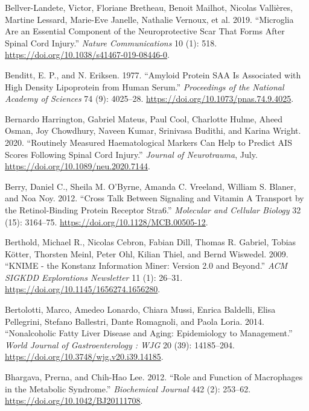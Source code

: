 \documentclass[9pt,lineno]{elife}
\newlength{\cslhangindent}
\newlength{\cslentryspacingunit} %
\newenvironment{CSLReferences}[2] %
 {%
  \setlength{\parindent}{0pt}
  \ifodd #1
  \let\oldpar\par
  \def\par{\hangindent=\cslhangindent\oldpar}
  \fi
  \setlength{\parskip}{#2\cslentryspacingunit}
 }%
 {}
\begin{document}
\begin{landscape}
\begin{landscape}
\begin{landscape}
\begin{landscape}
\begin{CSLReferences}{1}{0}
\leavevmode{}%
Bellver-Landete, Victor, Floriane Bretheau, Benoit Mailhot, Nicolas Vallières, Martine Lessard, Marie-Eve Janelle, Nathalie Vernoux, et al. 2019. {``Microglia Are an Essential Component of the Neuroprotective Scar That Forms After Spinal Cord Injury.''} \emph{Nature Communications} 10 (1): 518. \url{https://doi.org/10.1038/s41467-019-08446-0}.

\leavevmode{}%
Benditt, E. P., and N. Eriksen. 1977. {``Amyloid Protein {SAA} Is Associated with High Density Lipoprotein from Human Serum.''} \emph{Proceedings of the National Academy of Sciences} 74 (9): 4025--28. \url{https://doi.org/10.1073/pnas.74.9.4025}.

\leavevmode{}%
Bernardo Harrington, Gabriel Mateus, Paul Cool, Charlotte Hulme, Aheed Osman, Joy Chowdhury, Naveen Kumar, Srinivasa Budithi, and Karina Wright. 2020. {``Routinely Measured Haematological Markers Can Help to Predict {AIS} Scores Following Spinal Cord Injury.''} \emph{Journal of Neurotrauma}, July. \url{https://doi.org/10.1089/neu.2020.7144}.

\leavevmode{}%
Berry, Daniel C., Sheila M. O'Byrne, Amanda C. Vreeland, William S. Blaner, and Noa Noy. 2012. {``Cross {Talk} Between {Signaling} and {Vitamin A Transport} by the {Retinol-Binding Protein Receptor Stra6}.''} \emph{Molecular and Cellular Biology} 32 (15): 3164--75. \url{https://doi.org/10.1128/MCB.00505-12}.

\leavevmode{}%
Berthold, Michael R., Nicolas Cebron, Fabian Dill, Thomas R. Gabriel, Tobias Kötter, Thorsten Meinl, Peter Ohl, Kilian Thiel, and Bernd Wiswedel. 2009. {``{KNIME} - the {Konstanz} Information Miner: Version 2.0 and Beyond.''} \emph{ACM SIGKDD Explorations Newsletter} 11 (1): 26--31. \url{https://doi.org/10.1145/1656274.1656280}.

\leavevmode{}%
Bertolotti, Marco, Amedeo Lonardo, Chiara Mussi, Enrica Baldelli, Elisa Pellegrini, Stefano Ballestri, Dante Romagnoli, and Paola Loria. 2014. {``Nonalcoholic Fatty Liver Disease and Aging: {Epidemiology} to Management.''} \emph{World Journal of Gastroenterology : WJG} 20 (39): 14185--204. \url{https://doi.org/10.3748/wjg.v20.i39.14185}.

\leavevmode{}%
Bhargava, Prerna, and Chih-Hao Lee. 2012. {``Role and Function of Macrophages in the Metabolic Syndrome.''} \emph{Biochemical Journal} 442 (2): 253--62. \url{https://doi.org/10.1042/BJ20111708}.


\end{CSLReferences}
\end{landscape}
\end{landscape}
\end{landscape}
\end{landscape}
\end{document}

